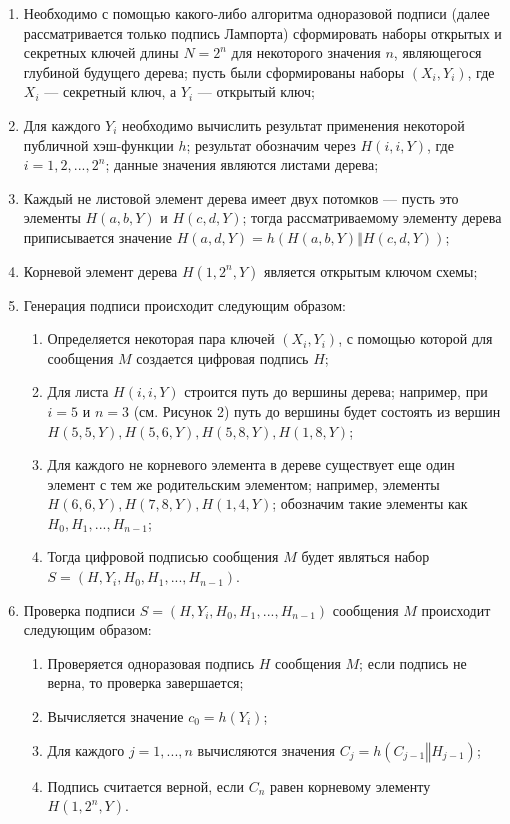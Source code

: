\documentclass{./civarticle}
\begin{document}
\begin{enumerate}
    \item Необходимо с помощью какого-либо алгоритма одноразовой подписи (далее рассматривается только подпись Лампорта) сформировать наборы открытых и секретных ключей длины $N = 2^n$ для некоторого значения $n$, являющегося глубиной будущего дерева; пусть были сформированы наборы $(X_i, Y_i)$, где $X_i$ --- секретный ключ, а $Y_i$ --- открытый ключ;
    \item Для каждого $Y_i$ необходимо вычислить результат применения некоторой публичной хэш-функции $h$; результат обозначим через $H(i, i, Y)$, где $i = 1, 2, ..., 2^n$; данные значения являются листами дерева;
    \item Каждый не листовой элемент дерева имеет двух потомков --- пусть это элементы $H(a, b, Y)$ и $H(c, d, Y)$; тогда рассматриваемому элементу дерева приписывается значение $H(a, d, Y) = h(H(a, b, Y) \mathbin\Vert H(c, d, Y))$;
    \item Корневой элемент дерева $H(1, 2^n, Y)$ является открытым ключом схемы;
    \item Генерация подписи происходит следующим образом:

    \begin{enumerate}
        \item Определяется некоторая пара ключей $(X_i, Y_i)$, с помощью которой для сообщения $M$ создается цифровая подпись $H$;
        \item Для листа $H(i, i, Y)$ строится путь до вершины дерева; например, при $i = 5$ и $n = 3$ (см. Рисунок 2) путь до вершины будет состоять из вершин $H(5, 5, Y), H(5, 6, Y), H(5, 8, Y), H(1, 8, Y)$;
        \item Для каждого не корневого элемента в дереве существует еще один элемент с тем же родительским элементом; например, элементы $H(6, 6, Y), H(7, 8, Y), H(1, 4, Y)$; обозначим такие элементы как $H_0, H_1, ..., H_{n-1}$;
        \item Тогда цифровой подписью сообщения $M$ будет являться набор $S = (H, Y_i, H_0, H_1, ..., H_{n-1})$.
    \end{enumerate}

    \item Проверка подписи $S = (H, Y_i, H_0, H_1, ..., H_{n-1})$ сообщения $M$ происходит следующим образом:

    \begin{enumerate}
        \item Проверяется одноразовая подпись $H$ сообщения $M$; если подпись не верна, то проверка завершается;
        \item Вычисляется значение $c_0 = h(Y_i)$;
        \item Для каждого $j = 1, ..., n$ вычисляются значения $C_j = h(C_{j-1} \mathbin\Vert H_{j-1})$;
        \item Подпись считается верной, если $C_n$ равен корневому элементу $H(1, 2^n, Y)$.
    \end{enumerate}
    
\end{enumerate}
\end{document}
